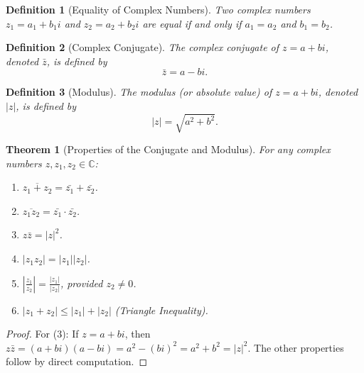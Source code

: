 \documentclass[11pt,a4paper]{article}
\newtheorem{theorem}{Theorem}
\newtheorem{definition}{Definition}
\begin{document}
\begin{definition}[Equality of Complex Numbers]
Two complex numbers $z_1 = a_1 + b_1 i$ and $z_2 = a_2 + b_2 i$ are equal if and only if $a_1 = a_2$ and $b_1 = b_2$.
\end{definition}
\begin{definition}[Complex Conjugate]
The \textit{complex conjugate} of $z = a + bi$, denoted $\bar{z}$, is defined by
\[
\bar{z} = a - bi.
\]
\end{definition}
\begin{definition}[Modulus]
The \textit{modulus} (or absolute value) of $z = a + bi$, denoted $|z|$, is defined by
\[
|z| = \sqrt{a^2 + b^2}.
\]
\end{definition}
\begin{theorem}[Properties of the Conjugate and Modulus]
For any complex numbers $z, z_1, z_2 \in \mathbb{C}$:
\begin{enumerate}
\item $\overline{z_1 + z_2} = \bar{z_1} + \bar{z_2}$.
\item $\overline{z_1 z_2} = \bar{z_1} \cdot \bar{z_2}$.
\item $z \bar{z} = |z|^2$.
\item $|z_1 z_2| = |z_1| |z_2|$.
\item $\left| \frac{z_1}{z_2} \right| = \frac{|z_1|}{|z_2|}$, provided $z_2 \neq 0$.
\item $|z_1 + z_2| \leq |z_1| + |z_2|$ (Triangle Inequality).
\end{enumerate}
\end{theorem}
\begin{proof}
For (3): If $z = a + bi$, then $z\bar{z} = (a+bi)(a-bi) = a^2 - (bi)^2 = a^2 + b^2 = |z|^2$. The other properties follow by direct computation.
\end{proof}
\end{document}
